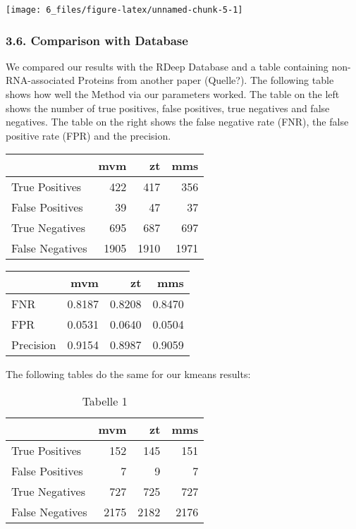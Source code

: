 \documentclass[
  12pt,
]{article}
\begin{document}
\texttt{[image: 6\_files/figure-latex/unnamed-chunk-5-1]}

\hypertarget{comparison-with-database}{%
\subsubsection{3.6. Comparison with
Database}\label{comparison-with-database}}

We compared our results with the RDeep Database and a table containing
non-RNA-associated Proteins from another paper (Quelle?). The following
table shows how well the Method via our parameters worked. The table on
the left shows the number of true positives, false positives, true
negatives and false negatives. The table on the right shows the false
negative rate (FNR), the false positive rate (FPR) and the precision.

\begin{table}
\centering
\begin{tabular}{l|r|r|r}
\hline
  & mvm & zt & mms\\
\hline
True Positives & 422 & 417 & 356\\
\hline
False Positives & 39 & 47 & 37\\
\hline
True Negatives & 695 & 687 & 697\\
\hline
False Negatives & 1905 & 1910 & 1971\\
\hline
\end{tabular}
\end{table}

\begin{table}
\centering
\begin{tabular}{l|r|r|r}
\hline
  & mvm & zt & mms\\
\hline
FNR & 0.8187 & 0.8208 & 0.8470\\
\hline
FPR & 0.0531 & 0.0640 & 0.0504\\
\hline
Precision & 0.9154 & 0.8987 & 0.9059\\
\hline
\end{tabular}
\end{table}

The following tables do the same for our kmeans results:

\begin{table}

\caption{\label{tab:unnamed-chunk-7}Tabelle 1}
\centering
\begin{tabular}[t]{l|r|r|r}
\hline
  & mvm & zt & mms\\
\hline
True Positives & 152 & 145 & 151\\
\hline
False Positives & 7 & 9 & 7\\
\hline
True Negatives & 727 & 725 & 727\\
\hline
False Negatives & 2175 & 2182 & 2176\\
\hline
\end{tabular}
\end{table}
\end{document}
